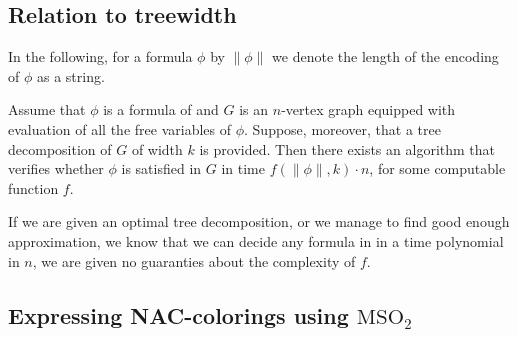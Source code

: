 \subsection{Relation to treewidth}

In the following, for a formula \( \phi \) by \( \|\phi\| \)
we denote the length of the encoding of \( \phi \) as a string.
%
\begin{theorem}%
	\label{theorem:courcelles_theorem}%
	Assume that \( \phi \) is a formula of \MSO{} and
	\( G \) is an \( n \)-vertex graph equipped
	with evaluation of all the free variables of \( \phi \).
	Suppose, moreover, that a tree decomposition of \( G \) of width \( k \) is provided.
	Then there exists an algorithm that verifies whether \( \phi \)
	is satisfied in \( G \) in time \( f (\|\phi\|, k) \cdot n \),
	for some computable function \( f \).
\end{theorem}
%
If we are given an optimal tree decomposition, or we manage to find good enough
approximation, we know that we can decide any formula in \MSO{} in a time
polynomial in \( n \), we are given no guaranties about the complexity of \( f \).

\subsection{Expressing NAC-colorings using \( \text{MSO}_2 \)}

